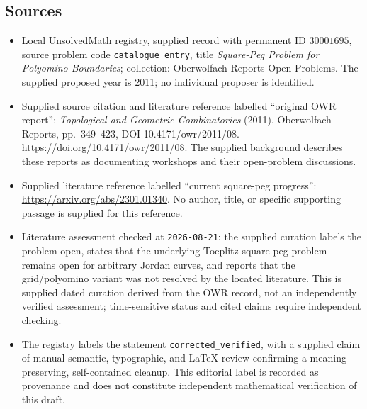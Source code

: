 \documentclass[11pt]{article}
\begin{document}
\subsection{Sources}
\begin{itemize}
\item Local UnsolvedMath registry, supplied record with permanent ID \(30001695\), source problem code \texttt{catalogue entry}, title \emph{Square-Peg Problem for Polyomino Boundaries}; collection: Oberwolfach Reports Open Problems. The supplied proposed year is 2011; no individual proposer is identified.
\item Supplied source citation and literature reference labelled ``original OWR report'': \emph{Topological and Geometric Combinatorics} (2011), Oberwolfach Reports, pp.\ 349--423, DOI 10.4171/owr/2011/08. \url{https://doi.org/10.4171/owr/2011/08}. The supplied background describes these reports as documenting workshops and their open-problem discussions.
\item Supplied literature reference labelled ``current square-peg progress'': \url{https://arxiv.org/abs/2301.01340}. No author, title, or specific supporting passage is supplied for this reference.
\item Literature assessment checked at \texttt{2026-08-21}: the supplied curation labels the problem open, states that the underlying Toeplitz square-peg problem remains open for arbitrary Jordan curves, and reports that the grid/polyomino variant was not resolved by the located literature. This is supplied dated curation derived from the OWR record, not an independently verified assessment; time-sensitive status and cited claims require independent checking.
\item The registry labels the statement \texttt{corrected\_verified}, with a supplied claim of manual semantic, typographic, and LaTeX review confirming a meaning-preserving, self-contained cleanup. This editorial label is recorded as provenance and does not constitute independent mathematical verification of this draft.
\end{itemize}
\end{document}
